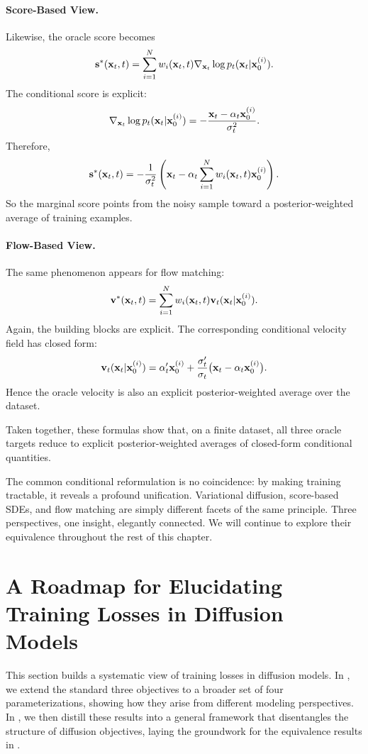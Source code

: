 {\paragraph{Score-Based View.}
Likewise, the oracle score becomes
\[
\mathbf{s}^*({\mathbf{x}}_t,t)
=
\sum_{i=1}^N
w_i({\mathbf{x}}_t,t) 
\nabla_{{\mathbf{x}}_t}\log p_t({\mathbf{x}}_t|{\mathbf{x}}_0^{(i)}).
\]
The conditional score is explicit:
\[
\nabla_{{\mathbf{x}}_t}\log p_t({\mathbf{x}}_t|{\mathbf{x}}_0^{(i)})
=
-\frac{{\mathbf{x}}_t-\alpha_t{\mathbf{x}}_0^{(i)}}{\sigma_t^2}.
\]
Therefore,
\[
\mathbf{s}^*({\mathbf{x}}_t,t)
=
-\frac{1}{\sigma_t^2}
\left(
{\mathbf{x}}_t-\alpha_t\sum_{i=1}^N w_i({\mathbf{x}}_t,t) {\mathbf{x}}_0^{(i)}
\right).
\]
So the marginal score points from the noisy sample toward a posterior-weighted average of training examples.

\paragraph{Flow-Based View.}
The same phenomenon appears for flow matching:
\[
\mathbf{v}^*({\mathbf{x}}_t,t)
=
\sum_{i=1}^N
w_i({\mathbf{x}}_t,t) 
\mathbf{v}_t({\mathbf{x}}_t|{\mathbf{x}}_0^{(i)}).
\]
Again, the building blocks are explicit. The corresponding conditional velocity field has closed form:
\[
\mathbf{v}_t({\mathbf{x}}_t|{\mathbf{x}}_0^{(i)})
=
{\alpha}'_t {\mathbf{x}}_0^{(i)}
+
\frac{{\sigma}'_t}{\sigma_t}\bigl({\mathbf{x}}_t-\alpha_t{\mathbf{x}}_0^{(i)}\bigr).
\]
Hence the oracle velocity is also an explicit posterior-weighted average over the dataset.

Taken together, these formulas show that, on a finite dataset, all three oracle targets reduce to explicit posterior-weighted averages of closed-form conditional quantities.
}

The common conditional reformulation is no coincidence: by making training tractable, it reveals a profound unification. Variational diffusion, score-based SDEs, and flow matching are simply different facets of the same principle. Three perspectives, one insight, elegantly connected. We will continue to explore their equivalence throughout the rest of this chapter.

\newpage
\clearpage

\section{A Roadmap for Elucidating Training Losses in Diffusion Models
}\label{sec:elucidating}

This section builds a systematic view of training losses in diffusion models.  
In , we extend the standard three objectives to a broader set of four parameterizations, showing how they arise from different modeling perspectives.  
In , we then distill these results into a general framework that disentangles the structure of diffusion objectives, laying the groundwork for the equivalence results in .




